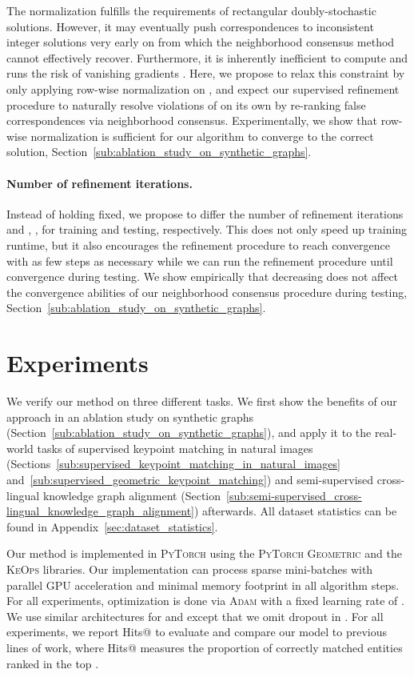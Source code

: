 \documentclass{article}
\begin{document}
The  normalization fulfills the requirements of rectangular doubly-stochastic solutions.
However, it may eventually push correspondences to inconsistent integer solutions very early on from which the neighborhood consensus method cannot effectively recover.
Furthermore, it is inherently inefficient to compute and runs the risk of vanishing gradients  \citep{Zhang/etal/2019b}.
Here, we propose to relax this constraint by only applying row-wise  normalization on , and expect our supervised refinement procedure to naturally resolve violations of  on its own by re-ranking false correspondences via neighborhood consensus.
Experimentally, we show that row-wise normalization is sufficient for our algorithm to converge to the correct solution, \cf{} Section~\ref{sub:ablation_study_on_synthetic_graphs}.

\paragraph{Number of refinement iterations.}

Instead of holding  fixed, we propose to differ the number of refinement iterations  and , , for training and testing, respectively.
This does not only speed up training runtime, but it also encourages the refinement procedure to reach convergence with as few steps as necessary while we can run the refinement procedure until convergence during testing.
We show empirically that decreasing  does not affect the convergence abilities of our neighborhood consensus procedure during testing, \cf{} Section~\ref{sub:ablation_study_on_synthetic_graphs}.

\section{Experiments}\label{sec:experiments}

We verify our method on three different tasks.
We first show the benefits of our approach in an ablation study on synthetic graphs (Section~\ref{sub:ablation_study_on_synthetic_graphs}), and apply it to the real-world tasks of supervised keypoint matching in natural images (Sections~\ref{sub:supervised_keypoint_matching_in_natural_images} and~\ref{sub:supervised_geometric_keypoint_matching}) and semi-supervised cross-lingual knowledge graph alignment (Section~\ref{sub:semi-supervised_cross-lingual_knowledge_graph_alignment}) afterwards.
All dataset statistics can be found in Appendix~\ref{sec:dataset_statistics}.

Our method is implemented in \textsc{PyTorch} \citep{Paszke/etal/2017} using the \textsc{PyTorch Geometric} \citep{Fey/Lenssen/2019} and the \textsc{KeOps} \citep{Charlier/etal/2019} libraries.
Our implementation can process sparse mini-batches with parallel GPU acceleration and minimal memory footprint in all algorithm steps.
For all experiments, optimization is done via \textsc{Adam} \citep{Kingma/Ba/2015} with a fixed learning rate of .
We use similar architectures for  and  except that we omit dropout \citep{Srivastava/etal/2014} in .
For all experiments, we report Hits@ to evaluate and compare our model to previous lines of work, where Hits@ measures the proportion of correctly matched entities ranked in the top .
\end{document}
